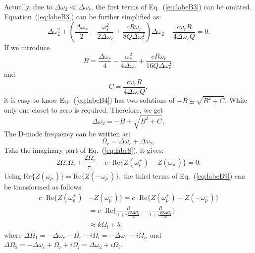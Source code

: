 \documentclass[%
 reprint,
 amsmath,amssymb,
 aps,
]{revtex4-1}
\begin{document}
Actually, due to $\Delta\omega_2\ll \Delta\omega_r$, the first terms of Eq.~(\ref{eq:labeB3}) can be omitted. Equation~(\ref{eq:labeB3}) can be further simplified as:
\begin{equation}\label{eq:labeB4}
   \Delta\omega^2_2+(\frac{\Delta\omega_r}{2}-\frac{\omega^2_s}{2\Delta\omega_r}+\frac{cR\omega_r}{8Q\Delta\omega^2_r})\Delta\omega_2-\frac{c\omega_r R}{4\Delta\omega_rQ}=0.
\end{equation}
If we introduce
\begin{equation}\label{eq:labeB5}
   B=\frac{\Delta\omega_r}{4}-\frac{\omega^2_s}{4\Delta\omega_r}+\frac{cR\omega_r}{16Q\Delta\omega^2_r}.
\end{equation}
and
\begin{equation}\label{eq:labeB6}
   C= \frac{c\omega_r R}{4\Delta\omega_r Q},
\end{equation}
it is easy to know Eq.~(\ref{eq:labeB4}) has two solutions of $-B\pm\sqrt{B^2+C}$. While only one closet to zero is required. Therefore, we get
\begin{equation}\label{eq:labeB7}
   \Delta\omega_2=-B+\sqrt{B^2+C},
\end{equation}
The D-mode frequency can be written as:
\begin{equation}\label{eq:labeB8}
   \Omega_r=\Delta\omega_r+\Delta\omega_2,
\end{equation}
Take the imaginary part of Eq.~(\ref{eq:labe8}), it gives:
\begin{equation}\label{eq:labeB9}
   2\Omega_r\Omega_i+\frac{2\Omega_r}{\tau_z}-c \cdot \mathrm {Re}\{Z(\omega^{+}_p)-Z(\omega^{-}_p)\}=0.
\end{equation}
Using $\mathrm {Re}\{Z(\omega^{-}_p)\}=\mathrm {Re}\{Z(-\omega^{-}_p)\}$, the third terms of Eq.~(\ref{eq:labeB9}) can be transformed as follows:
\begin{equation}\label{eq:labeB10}
   \begin{aligned}
   c \cdot \mathrm {Re}\{Z(\omega^{+}_p)&-Z(\omega^{-}_p)\} =c \cdot \mathrm {Re}\{Z(\omega^{+}_p)-Z(-\omega^{-}_p)\}\\
   &=c \cdot \mathrm {Re}\{\frac{R}{1+i\frac{2Q\Delta\Omega_1}{\omega_r}}-\frac{R}{1+i\frac{2Q\Delta\Omega_2}{\omega_r}}\}\\
   &\approx k\Omega_i+b.
   \end{aligned}
\end{equation}
where $\Delta\Omega_1=-\Delta\omega_r-\Omega_r-i\Omega_i=-\Delta\omega_1-i\Omega_i$, and $\Delta\Omega_2=-\Delta\omega_r+\Omega_r+i\Omega_i=\Delta\omega_2+i\Omega_i$.
\end{document}
